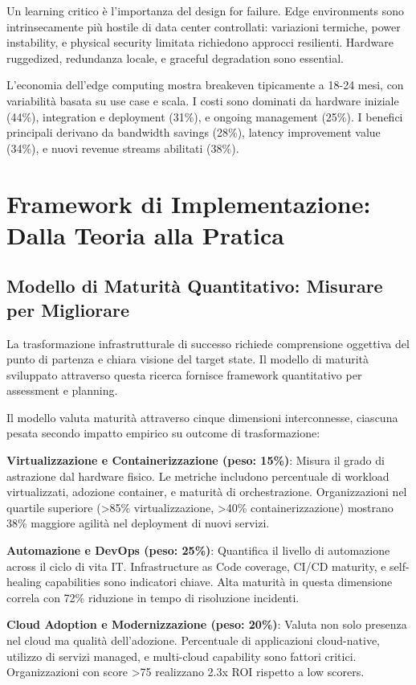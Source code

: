 Un learning critico è l'importanza del design for failure. Edge environments sono intrinsecamente più hostile di data center controllati: variazioni termiche, power instability, e physical security limitata richiedono approcci resilienti. Hardware ruggedized, redundanza locale, e graceful degradation sono essential.

L'economia dell'edge computing mostra breakeven tipicamente a 18-24 mesi, con variabilità basata su use case e scala. I costi sono dominati da hardware iniziale (44\%), integration e deployment (31\%), e ongoing management (25\%). I benefici principali derivano da bandwidth savings (28\%), latency improvement value (34\%), e nuovi revenue streams abilitati (38\%).

\section{Framework di Implementazione: Dalla Teoria alla Pratica}

\subsection{Modello di Maturità Quantitativo: Misurare per Migliorare}

La trasformazione infrastrutturale di successo richiede comprensione oggettiva del punto di partenza e chiara visione del target state. Il modello di maturità sviluppato attraverso questa ricerca fornisce framework quantitativo per assessment e planning.

Il modello valuta maturità attraverso cinque dimensioni interconnesse, ciascuna pesata secondo impatto empirico su outcome di trasformazione:

\textbf{Virtualizzazione e Containerizzazione (peso: 15\%)}: Misura il grado di astrazione dal hardware fisico. Le metriche includono percentuale di workload virtualizzati, adozione container, e maturità di orchestrazione. Organizzazioni nel quartile superiore (>85\% virtualizzazione, >40\% containerizzazione) mostrano 38\% maggiore agilità nel deployment di nuovi servizi.

\textbf{Automazione e DevOps (peso: 25\%)}: Quantifica il livello di automazione across il ciclo di vita IT. Infrastructure as Code coverage, CI/CD maturity, e self-healing capabilities sono indicatori chiave. Alta maturità in questa dimensione correla con 72\% riduzione in tempo di risoluzione incidenti.

\textbf{Cloud Adoption e Modernizzazione (peso: 20\%)}: Valuta non solo presenza nel cloud ma qualità dell'adozione. Percentuale di applicazioni cloud-native, utilizzo di servizi managed, e multi-cloud capability sono fattori critici. Organizzazioni con score >75 realizzano 2.3x ROI rispetto a low scorers.


